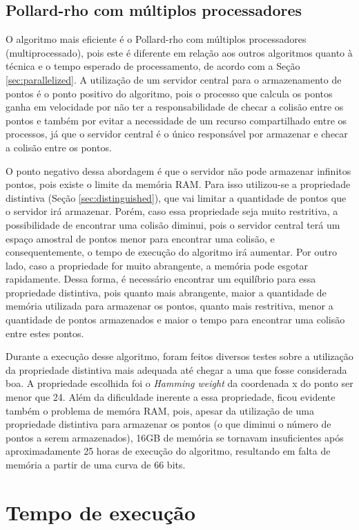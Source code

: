 \subsection{Pollard-rho com múltiplos processadores}
O algoritmo mais eficiente é o Pollard-rho com múltiplos processadores (multiprocessado), pois este é diferente em relação aos outros algoritmos quanto à técnica e o tempo esperado de processamento, de acordo com a Seção \ref{sec:parallelized}. A utilização de um servidor central para o armazenamento de pontos é o ponto positivo do algoritmo, pois o processo que calcula os pontos ganha em velocidade por não ter a responsabilidade de checar a colisão entre os pontos e também por evitar a necessidade de um recurso compartilhado entre os processos, já que o servidor central é o único responsável por armazenar e checar a colisão entre os pontos.

O ponto negativo dessa abordagem é que o servidor não pode armazenar infinitos pontos, pois existe o limite da memória RAM. Para isso utilizou-se a propriedade distintiva (Seção \ref{sec:distinguished}), que vai limitar a quantidade de pontos que o servidor irá armazenar. Porém, caso essa propriedade seja muito restritiva, a possibilidade de encontrar uma colisão diminui, pois o servidor central terá um espaço amostral de pontos menor para encontrar uma colisão, e consequentemente, o tempo de execução do algoritmo irá aumentar. Por outro lado, caso a propriedade for muito abrangente, a memória pode esgotar rapidamente. Dessa forma, é necessário encontrar um equilíbrio para essa propriedade distintiva, pois quanto mais abrangente, maior a quantidade de memória utilizada para armazenar os pontos, quanto mais restritiva, menor a quantidade de pontos armazenados e maior o tempo para encontrar uma colisão entre estes pontos.

Durante a execução desse algoritmo, foram feitos diversos testes sobre a utilização da propriedade distintiva mais adequada até chegar a uma que fosse considerada boa. A propriedade escolhida foi o \textit{Hamming weight} da coordenada x do ponto ser menor que 24. Além da dificuldade inerente a essa propriedade, ficou evidente também o problema de memóra RAM, pois, apesar da utilização de uma propriedade distintiva para armazenar os pontos (o que diminui o número de pontos a serem armazenados), 16GB de memória se tornavam insuficientes após aproximadamente 25 horas de execução do algoritmo, resultando em falta de memória a partir de uma curva de 66 bits.

\section{Tempo de execução}
\label{sec:execution_time}

